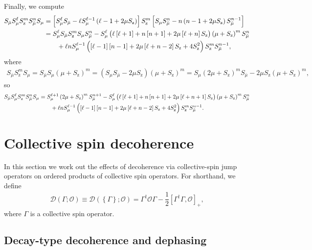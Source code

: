 \documentclass[aps,notitlepage,nofootinbib,11pt]{revtex4-1}
\newcommand{\f}[2]{\dfrac{#1}{#2}} %
\newcommand{\p}[1]{\left(#1\right)} %
\renewcommand{\sp}[1]{\left[#1\right]} %
\renewcommand{\set}[1]{\left\{#1\right\}} %
\newcommand{\D}{\mathcal{D}}
\renewcommand{\O}{\mathcal{O}}
\newcommand{\z}{\text{z}}
\newcommand{\bmu}{{\bar\mu}}
\newcommand{\1}{\mathds{1}}
\begin{document}
Finally, we compute
\begin{align}
  S_\bmu S_\mu^\ell S_\z^m S_\bmu^n S_\mu
  &= \sp{S_\mu^\ell S_\bmu - \ell S_\mu^{\ell-1} \p{\ell-1+2\mu S_\z}}
  S_\z^m
  \sp{S_\mu S_\bmu^n - n \p{n-1+2\mu S_\z} S_\bmu^{n-1}} \\
  &= S_\mu^\ell S_\bmu S_\z^m S_\mu S_\bmu^n
  - S_\mu^\ell \p{\ell\sp{\ell+1} + n\sp{n+1}+2\mu\sp{\ell+n} S_\z}
  \p{\mu+S_\z}^m S_\bmu^n \notag \\
  &\qquad + \ell n S_\mu^{\ell-1}
  \p{\sp{\ell-1}\sp{n-1}+2\mu\sp{\ell+n-2} S_\z + 4 S_\z^2}
  S_\z^m S_\bmu^{n-1},
\end{align}
where
\begin{align}
  S_\bmu S_\z^m S_\mu
  = S_\bmu S_\mu \p{\mu+S_\z}^m
  = \p{S_\mu S_\bmu - 2\mu S_\z} \p{\mu+S_\z}^m
  = S_\mu \p{2\mu + S_\z}^m S_\bmu - 2\mu S_\z \p{\mu + S_\z}^m,
\end{align}
so
\begin{align}
  S_\bmu S_\mu^\ell S_\z^m S_\bmu^n S_\mu
  &= S_\mu^{\ell+1} \p{2\mu + S_\z}^m S_\bmu^{n+1}
  - S_\mu^\ell \p{\ell\sp{\ell+1} + n\sp{n+1}+2\mu\sp{\ell+n+1} S_\z}
  \p{\mu+S_\z}^m S_\bmu^n \notag \\
  &\qquad + \ell n S_\mu^{\ell-1}
  \p{\sp{\ell-1}\sp{n-1}+2\mu\sp{\ell+n-2} S_\z + 4 S_\z^2}
  S_\z^m S_\bmu^{n-1}.
\end{align}


\section{Collective spin decoherence}
\label{sec:decoherence_collective}

In this section we work out the effects of decoherence via
collective-spin jump operators on ordered products of collective spin
operators.  For shorthand, we define
\begin{align}
  \D\p{\Gamma;\O}
  \equiv \D\p{\set{\Gamma};\O}
  = \Gamma^\dag \O \Gamma - \f12\sp{\Gamma^\dag \Gamma, \O}_+,
\end{align}
where $\Gamma$ is a collective spin operator.

\subsection{Decay-type decoherence and dephasing}
\label{sec:decay_dephasing_collective}
\end{document}
